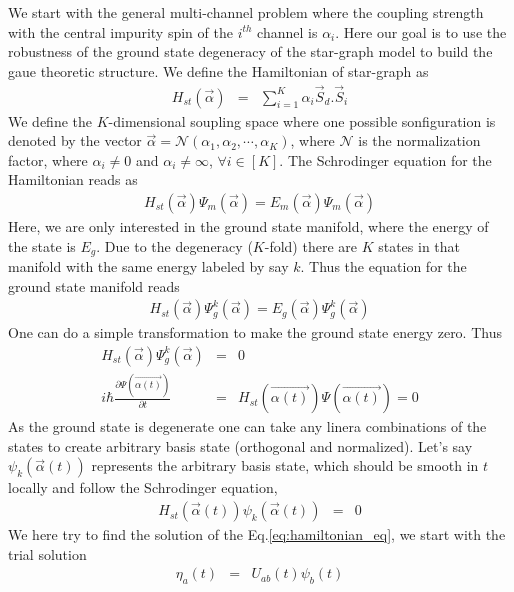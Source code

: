 \documentclass[reprint,prb,superscriptaddress]{revtex4-2}
\begin{document}
We start with the general multi-channel problem where the coupling strength with the central impurity spin of the $i^{th}$ channel is $\alpha_i$. Here our goal is to use the robustness of the ground state degeneracy of the star-graph model to build the gaue theoretic structure. We define the Hamiltonian of star-graph as 
\begin{eqnarray}
H_{st}(\vec{\alpha}) &=& \displaystyle\sum_{i=1}^{K} \alpha_i \vec{S}_d.\vec{S}_i
\end{eqnarray}
We define the $K$-dimensional soupling space where one possible sonfiguration is denoted by the vector $\vec{\alpha}=\mathcal{N}(\alpha_1,\alpha_2,\cdots,\alpha_K)$, where $\mathcal{N}$ is the normalization factor, where $\alpha_i\neq 0$ and $\alpha_i\neq \infty $, $\forall i\in[K]$. The Schrodinger equation for the Hamiltonian reads as 
\begin{eqnarray}
H_{st}(\vec{\alpha}) \Psi_{m} (\vec{\alpha}) = E_{m} (\vec{\alpha}) \Psi_{m} (\vec{\alpha})
\end{eqnarray}
Here, we are only interested in the ground state manifold, where the energy of the state is $E_{g}$. Due to the degeneracy ($K$-fold) there are $K$ states in that manifold with the same energy labeled by say $k$. Thus the equation for the ground state manifold reads
\begin{eqnarray}
H_{st}(\vec{\alpha}) \Psi^{k}_{g} (\vec{\alpha}) = E_{g} (\vec{\alpha}) \Psi^{k}_{g} (\vec{\alpha})
\end{eqnarray}
One can do a simple transformation to make the ground state energy zero. Thus
\begin{eqnarray}
H_{st}(\vec{\alpha}) \Psi^{k}_{g} (\vec{\alpha}) &=&  0 \nonumber\\
i\hbar \frac{\partial \Psi(\vec{\alpha(t)}) }{\partial t} &=& H_{st}(\vec{\alpha(t)}) \Psi(\vec{\alpha(t)}) =0
\label{eq:hamiltonian_eq}
\end{eqnarray}
As the ground state is degenerate one can take any linera combinations of the states to create arbitrary basis state (orthogonal and normalized). Let's say $\psi_k(\vec{\alpha}(t))$ represents the arbitrary basis state, which should  be smooth in $t$ locally and follow the Schrodinger equation,
\begin{eqnarray}
H_{st}(\vec{\alpha}(t)) \psi_k(\vec{\alpha}(t)) &=&  0 
\end{eqnarray}
We here try to find the solution of the Eq.\eqref{eq:hamiltonian_eq}, we start with the trial solution 
\begin{eqnarray}
\eta_a(t) &=& U_{ab}(t) \psi_b(t)
\end{eqnarray}
\end{document}
